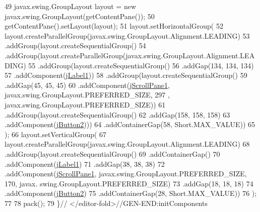 \begin{DoxyCode}
49         javax.swing.GroupLayout layout = \textcolor{keyword}{new} javax.swing.GroupLayout(getContentPane());
50         getContentPane().setLayout(layout);
51         layout.setHorizontalGroup(
52             layout.createParallelGroup(javax.swing.GroupLayout.Alignment.LEADING)
53             .addGroup(layout.createSequentialGroup()
54                 .addGroup(layout.createParallelGroup(javax.swing.GroupLayout.Alignment.LEADING)
55                     .addGroup(layout.createSequentialGroup()
56                         .addGap(134, 134, 134)
57                         .addComponent(\mbox{\hyperlink{classinterfacessoguar_1_1consultarvisitas_a3f7c47a95b552b6f38101034ebbc937c}{jLabel1}}))
58                     .addGroup(layout.createSequentialGroup()
59                         .addGap(45, 45, 45)
60                         .addComponent(\mbox{\hyperlink{classinterfacessoguar_1_1consultarvisitas_a123ca0ae66add36e7be0e216c23da5c1}{jScrollPane1}}, javax.swing.GroupLayout.PREFERRED\_SIZE, 297
      , javax.swing.GroupLayout.PREFERRED\_SIZE))
61                     .addGroup(layout.createSequentialGroup()
62                         .addGap(158, 158, 158)
63                         .addComponent(\mbox{\hyperlink{classinterfacessoguar_1_1consultarvisitas_a09ee7f5abf5bf05970c4c33ee61dd1d0}{jButton2}})))
64                 .addContainerGap(58, Short.MAX\_VALUE))
65         );
66         layout.setVerticalGroup(
67             layout.createParallelGroup(javax.swing.GroupLayout.Alignment.LEADING)
68             .addGroup(layout.createSequentialGroup()
69                 .addContainerGap()
70                 .addComponent(\mbox{\hyperlink{classinterfacessoguar_1_1consultarvisitas_a3f7c47a95b552b6f38101034ebbc937c}{jLabel1}})
71                 .addGap(38, 38, 38)
72                 .addComponent(\mbox{\hyperlink{classinterfacessoguar_1_1consultarvisitas_a123ca0ae66add36e7be0e216c23da5c1}{jScrollPane1}}, javax.swing.GroupLayout.PREFERRED\_SIZE, 170, javax.
      swing.GroupLayout.PREFERRED\_SIZE)
73                 .addGap(18, 18, 18)
74                 .addComponent(\mbox{\hyperlink{classinterfacessoguar_1_1consultarvisitas_a09ee7f5abf5bf05970c4c33ee61dd1d0}{jButton2}})
75                 .addContainerGap(28, Short.MAX\_VALUE))
76         );
77 
78         pack();
79     \}\textcolor{comment}{// </editor-fold>//GEN-END:initComponents}
\end{DoxyCode}
\mbox{\label{classinterfacessoguar_1_1consultarvisitas_af12086ef01e9970a7f7b6c94a81e843b}} 
